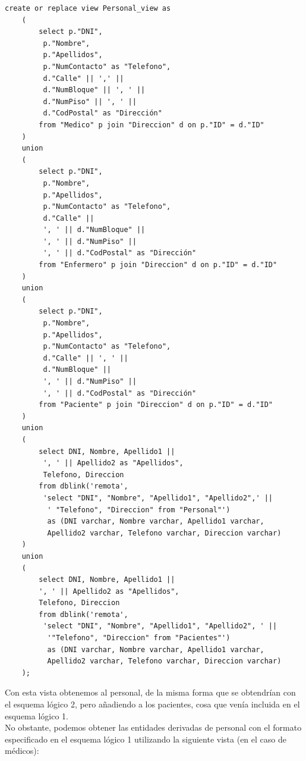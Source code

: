 \documentclass{article}
\begin{document}
\begin{lstlisting}
create or replace view Personal_view as 
    (
        select p."DNI", 
         p."Nombre", 
         p."Apellidos", 
         p."NumContacto" as "Telefono", 
         d."Calle" || ',' || 
         d."NumBloque" || ', ' || 
         d."NumPiso" || ', ' || 
         d."CodPostal" as "Dirección"
        from "Medico" p join "Direccion" d on p."ID" = d."ID"
    )
    union
    (
        select p."DNI", 
         p."Nombre", 
         p."Apellidos", 
         p."NumContacto" as "Telefono", 
         d."Calle" || 
         ', ' || d."NumBloque" || 
         ', ' || d."NumPiso" || 
         ', ' || d."CodPostal" as "Dirección"
        from "Enfermero" p join "Direccion" d on p."ID" = d."ID"
    )
    union
    (
        select p."DNI",
         p."Nombre",
         p."Apellidos",
         p."NumContacto" as "Telefono",
         d."Calle" || ', ' ||
         d."NumBloque" ||
         ', ' || d."NumPiso" ||
         ', ' || d."CodPostal" as "Dirección"
        from "Paciente" p join "Direccion" d on p."ID" = d."ID"
    )
    union
    (
        select DNI, Nombre, Apellido1 || 
         ', ' || Apellido2 as "Apellidos", 
         Telefono, Direccion
		from dblink('remota',
		 'select "DNI", "Nombre", "Apellido1", "Apellido2",' ||
		  ' "Telefono", "Direccion" from "Personal"') 
		  as (DNI varchar, Nombre varchar, Apellido1 varchar, 
		  Apellido2 varchar, Telefono varchar, Direccion varchar)
    )
    union
    (
        select DNI, Nombre, Apellido1 || 
        ', ' || Apellido2 as "Apellidos", 
        Telefono, Direccion
		from dblink('remota', 
		 'select "DNI", "Nombre", "Apellido1", "Apellido2", ' || 
		  '"Telefono", "Direccion" from "Pacientes"') 
		  as (DNI varchar, Nombre varchar, Apellido1 varchar,
		  Apellido2 varchar, Telefono varchar, Direccion varchar)
    );
\end{lstlisting}


Con esta vista obtenemos al personal, de la misma forma que se obtendrían con el esquema lógico 2, pero añadiendo a los pacientes, cosa que venía incluida en el esquema lógico 1.\\
No obstante, podemos obtener las entidades derivadas de personal con el formato especificado en el esquema lógico 1 utilizando la siguiente vista (en el caso de médicos):
\end{document}

